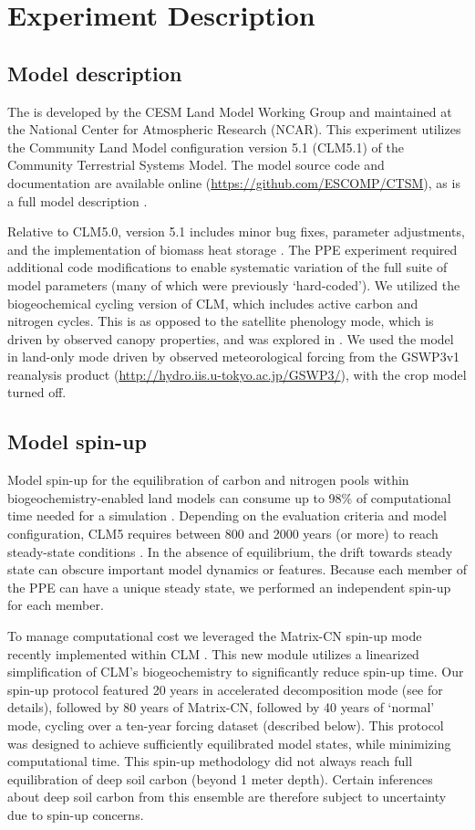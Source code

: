 \documentclass[draft]{agujournal2019}
\begin{document}
\section{Experiment Description}
\label{methods}
\subsection{Model description}
\label{sect:md}
The is developed by the CESM Land Model Working Group and maintained at the National Center for Atmospheric Research (NCAR). This experiment utilizes the Community Land Model configuration version 5.1 (CLM5.1) of the Community Terrestrial Systems Model. The model source code and documentation are available online (\url{https://github.com/ESCOMP/CTSM}), as is a full model description \cite{lawrence2019}.

Relative to CLM5.0, version 5.1 includes minor bug fixes, parameter adjustments, and the implementation of biomass heat storage \cite{swenson2019}. The PPE experiment required additional code modifications to enable systematic variation of the full suite of model parameters (many of which were previously `hard-coded'). We utilized the biogeochemical cycling version of CLM, which includes active carbon and nitrogen cycles. This is as opposed to the satellite phenology mode, which is driven by observed canopy properties, and was explored in . We used the model in land-only mode driven by observed meteorological forcing from the GSWP3v1 reanalysis product (\url{http://hydro.iis.u-tokyo.ac.jp/GSWP3/}), with the crop model turned off.

\subsection{Model spin-up}
\label{sect:mcn}
Model spin-up for the equilibration of carbon and nitrogen pools within biogeochemistry-enabled land models can consume up to 98\% of computational time needed for a simulation \cite{sun2023}. Depending on the evaluation criteria and model configuration, CLM5 requires between 800 and 2000 years (or more) to reach steady-state conditions \cite{lawrence2019}. In the absence of equilibrium, the drift towards steady state can obscure important model dynamics or features. Because each member of the PPE can have a unique steady state, we performed an independent spin-up for each member.

To manage computational cost we leveraged the Matrix-CN spin-up mode recently implemented within CLM \cite{lu2020}. This new module utilizes a linearized simplification of CLM's biogeochemistry to significantly reduce spin-up time. Our spin-up protocol featured 20 years in accelerated decomposition mode (see  for details), followed by 80 years of Matrix-CN, followed by 40 years of `normal' mode, cycling over a ten-year forcing dataset (described below). This protocol was designed to achieve sufficiently equilibrated model states, while minimizing computational time. This spin-up methodology did not always reach full equilibration of deep soil carbon (beyond 1 meter depth). Certain inferences about deep soil carbon from this ensemble are therefore subject to uncertainty due to spin-up concerns.
\end{document}
